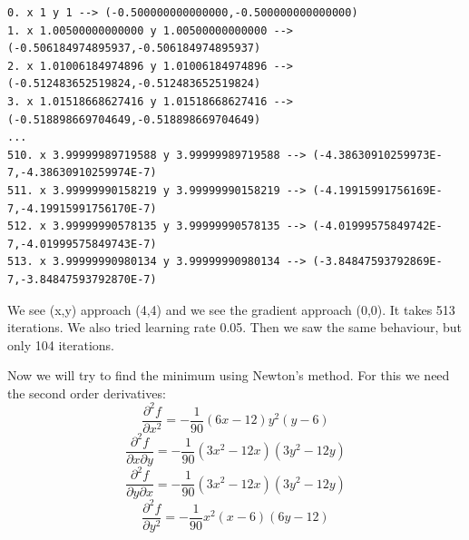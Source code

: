\documentclass[12pt, letterpaper]{article}
\begin{document}
{\footnotesize
\begin{verbatim}
0. x 1 y 1 --> (-0.500000000000000,-0.500000000000000)
1. x 1.00500000000000 y 1.00500000000000 --> (-0.506184974895937,-0.506184974895937)
2. x 1.01006184974896 y 1.01006184974896 --> (-0.512483652519824,-0.512483652519824)
3. x 1.01518668627416 y 1.01518668627416 --> (-0.518898669704649,-0.518898669704649)
...
510. x 3.99999989719588 y 3.99999989719588 --> (-4.38630910259973E-7,-4.38630910259974E-7)
511. x 3.99999990158219 y 3.99999990158219 --> (-4.19915991756169E-7,-4.19915991756170E-7)
512. x 3.99999990578135 y 3.99999990578135 --> (-4.01999575849742E-7,-4.01999575849743E-7)
513. x 3.99999990980134 y 3.99999990980134 --> (-3.84847593792869E-7,-3.84847593792870E-7)
\end{verbatim}
}
We see (x,y) approach (4,4) and we see the gradient approach (0,0). It takes 513 iterations.
We also tried learning rate 0.05. Then we saw the same behaviour, but only 104 iterations.

Now we will try to find the minimum using Newton's method. For this we need the second order derivatives:\\
\[
\frac{\partial^2 f}{\partial x^2} = - \frac{1}{90}(6x-12)y^2(y-6)
\]
\[
\frac{\partial^2 f}{\partial x \partial y} = - \frac{1}{90}(3x^2-12x)(3y^2-12y)
\]
\[
\frac{\partial^2 f}{\partial y \partial x} = - \frac{1}{90}(3x^2-12x)(3y^2-12y)
\]
\[
\frac{\partial^2 f}{\partial y^2} = - \frac{1}{90}x^2(x-6)(6y-12)
\]
\end{document}
